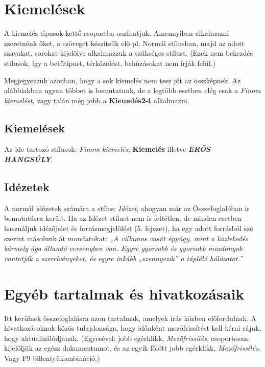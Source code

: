 \documentclass[a4paper, 12pt]{article}
\begin{document}
	\section{Kiemelések}
	\label{sec:3}
	A kiemelés típusok kettő csoportba oszthatjuk.
	Amennyiben alkalmazni szeretnénk őket, a szöveget készítsük elő pl. Normál stílusban, majd az adott szavakat, sorokat kijelölve alkalmazzuk a szükséges stílust.
	(Ezek nem bekezdés stílusok, így a betűtípust, térközölést, behúzásokat nem írják felül.)
	\par
	Megjegyezzük azonban, hogy a sok kiemelés nem tesz jót az összképnek.
	Az alábbiakban ugyan többet is bemutatunk, de a legtöbb esetben elég csak a \textit{\textcolor{bme}{Finom kiemelést}}, vagy talán még jobb a \textbf{Kiemelés2-t} alkalmazni.
	\par
	\subsection{Kiemelések}
	Az ide tartozó stílusok: \textit{\textcolor{bme}{Finom kiemelés}}, \textbf{\textcolor{bme}{Kiemelés}} illetve \textbf{\textit{\textcolor{bme}{ERŐS HANGSÚLY}}}.
	\subsection{Idézetek}
	A normál idézetek számára a stílus: \textit{Idézet}, ahogyan már az Összefoglalóban is bemutatásra került.
	Ha az Idézet stílust nem is feltétlen, de minden esetben használjuk idézőjelet és forrásmegjelölést (5. fejezet), ha egy adott forrásból szó szerint másolunk át mondatokat: \textit{„A villamos vasút éppúgy, mint a közlekedés bármely ága állandó versenyben van. Egyre gyorsabb és gyorsabb mozdonyok vontatják a szerelvényeket, és egyre inkább „szennyezik” a tápláló hálózatot.”} \cite{ART:1}
	\newpage

	\section{Egyéb tartalmak és hivatkozásaik}
	Itt kerülnek összefoglalásra azon tartalmak, amelyek írás közben előfordulnak.
	A hivatkozásoknak közös tulajdonsága, hogy időnként mezőfrissítést kell kérni rájuk, hogy aktualizálódjanak.
	(Egyesével: jobb egérklikk, \textit{\textcolor{bme}{Mezőfrissítés}}, csoportosan: kijelöljük az egész dokumentumot, és az egyik fölött jobb egérklikk, \textit{\textcolor{bme}{Mezőfrissítés}}. Vagy F9 billentyűkombináció.)
\end{document}
